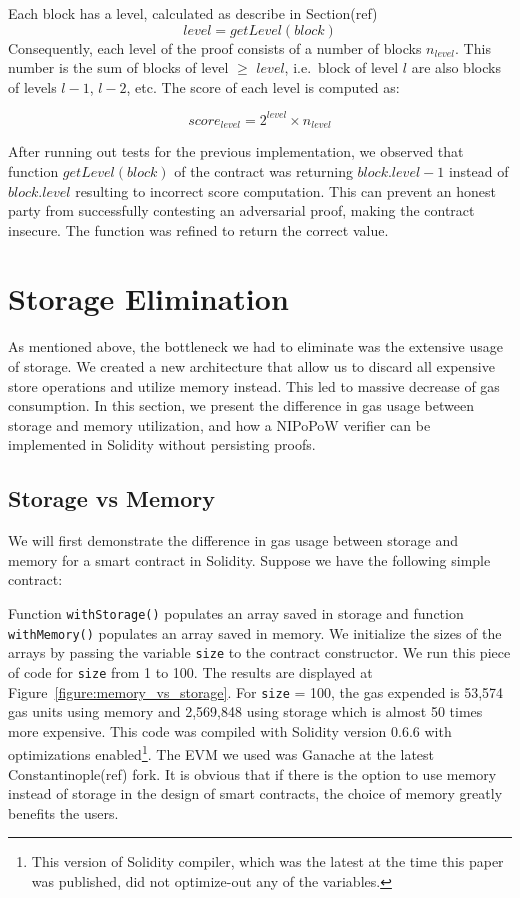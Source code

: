 
Each block has a level, calculated as describe in Section(ref)
\[ level = getLevel(block) \]
Consequently, each level of the proof consists of a number of blocks
$n_{level}$. This number is the sum of blocks of level $\geq$ $level$, i.e.\
block of level $l$ are also blocks of levels $l-1$, $l-2$, etc. The
score of each level is computed as:

\[score_{level} = 2^{level} \times n_{level}\]

After running out tests for the previous implementation, we observed that
function $getLevel(block)$ of the contract was returning $block.level-1$
instead of $block.level$ resulting to incorrect score computation. This can
prevent an honest party from successfully contesting an adversarial proof,
making the contract insecure. The function was refined to return the correct
value.

\section{Storage Elimination}

As mentioned above, the bottleneck we had to eliminate was the extensive usage
of storage. We created a new architecture that allow us to discard all
expensive store operations and utilize memory instead. This led to massive
decrease of gas consumption. In this section, we present the difference in gas
usage between storage and memory utilization, and how a NIPoPoW verifier can be
implemented in Solidity without persisting proofs.

\subsection{Storage vs Memory}

We will first demonstrate the difference in gas usage between storage and
memory for a smart contract in Solidity. Suppose we have the following simple
contract:



Function \texttt{withStorage()} populates an array saved in storage and
function \texttt{withMemory()} populates an array saved in memory. We
initialize the sizes of the arrays by passing the variable \texttt{size} to the
contract constructor. We run this piece of code for \texttt{size} from 1 to
100. The results are displayed at Figure~\ref{figure:memory_vs_storage}. For
\texttt{size} = 100, the gas expended is 53,574 gas units using memory and
2,569,848 using storage which is almost 50 times more expensive. This code was
compiled with Solidity version 0.6.6 with optimizations enabled\footnote{This
version of Solidity compiler, which was the latest at the time this paper was
published, did not optimize-out any of the variables.}. The EVM we used  was
Ganache at the latest Constantinople(ref) fork. It is obvious that if there is
the option to use memory instead of storage in the design of smart contracts,
the choice of memory greatly benefits the users.

